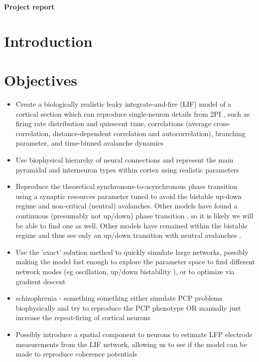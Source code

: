 \documentclass[a4paper, 12pt]{article}
\begin{document}
\noindent
\huge\textbf{Project report}
\normalsize

\section*{Introduction}

\section*{Objectives}

\begin{itemize}
\item Create a biologically realistic leaky integrate-and-fire (LIF) model of a cortical section which can reproduce single-neuron details from 2PI \cite{bellaypaper}, such as firing rate distribution and quiescent time, correlations (average cross-correlation, distance-dependent correlation and autocorrelation), branching parameter, and time-binned avalanche dynamics
  
\item Use biophysical hierarchy of neural connections \cite{rubinov} and represent the main pyramidal and interneuron types within cortex using realistic parameters \cite{objectworkingmemory}
  
\item Reproduce the theoretical synchronous-to-asynchronous phase transition \cite{munozlg} using a synaptic resources parameter tuned to avoid the bistable up-down regime and non-critical (neutral) avalanches. Other models have found a continuous (presumably not up/down) phase transition \cite{rubinov}, so it is likely we will be able to find one as well. Other models have remained within the bistable regime and thus see only an up/down transition with neutral avalanches \cite{neutraltheory}.
  
\item Use the 'exact' solution method \cite{exactsolution} to quickly simulate large networks, possibly making the model fast enough to explore the parameter space to find different network modes (eg oscillation, up/down bistability \cite{munozlg}), or to optimize via gradient descent
  
\item schizophrenia - something something either simulate PCP problems biophysically and try to reproduce the PCP phenotype OR manually just increase the repeat-firing of cortical neurons
  
\item Possibly introduce a spatial component to neurons to estimate LFP electrode measurements from the LIF network, allowing us to see if the model can be made to reproduce coherence potentials
\end{itemize}
\end{document}
